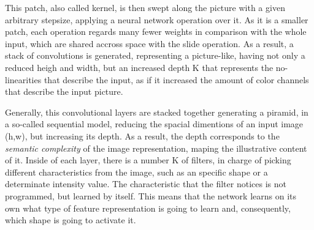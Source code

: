 This patch, also called kernel, is then swept along the picture with a given arbitrary stepsize, applying a neural network operation over it. As it is a smaller patch, each operation regards many fewer weights in comparison with the whole input, which are shared accross space with the slide operation. As a result, a stack of convolutions is generated, representing a picture-like, having not only a reduced heigh and width, but an increased depth K that represents the no-linearities that describe the input, as if it increased the amount of color channels that describe the input picture.

Generally, this convolutional layers are stacked together generating a piramid, in a so-called sequential model, reducing the spacial dimentions of an input image (h,w), but increasing its depth. As a result, the depth corresponds to the \emph{semantic complexity} of the image representation, maping the illustrative content of it. Inside of each layer, there is a number K of filters, in charge of picking different characteristics from the image, such as an specific shape or a determinate intensity value. The characteristic that the filter notices is not programmed, but learned by itself. This means that the network learns on its own what type of feature representation is going to learn and, consequently, which shape is going to activate it.


